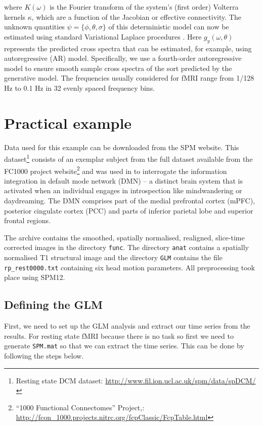 where $K(\omega)$ is the Fourier transform of the system's (first order) Volterra kernels  $\kappa$, which are a function of the Jacobian or effective connectivity. The unknown quantities $\psi=\{\phi,\theta,\sigma\}$ of this deterministic model can now be estimated using standard Variational Laplace procedures \cite{karl_vb_laplace}. Here $g_{y} (\omega,\theta)$ represents the predicted cross spectra that can be estimated, for example, using autoregressive (AR) model. Specifically, we use a fourth-order autoregressive model to ensure smooth sample cross spectra of the sort predicted by the generative model. The frequencies usually considered for fMRI range from 1/128 Hz to 0.1 Hz in 32 evenly spaced frequency bins.

\section{Practical example}

Data used for this example can be downloaded from the SPM website. This dataset\footnote{Resting state DCM dataset: \url{http://www.fil.ion.ucl.ac.uk/spm/data/spDCM/}} consists of an exemplar subject from the full dataset available from the FC1000 project website\footnote{``1000 Functional Connectomes'' Project,: \url{http://fcon_1000.projects.nitrc.org/fcpClassic/FcpTable.html}} and was used in \cite{rsDCM2015} to interrogate the information integration in default mode network (DMN) -- a distinct brain system that is activated when an individual engages in introspection like mindwandering or daydreaming. The DMN comprises part of the medial prefrontal cortex (mPFC), posterior cingulate cortex (PCC) and parts of inferior parietal lobe and superior frontal regions.

The archive contains the smoothed, spatially normalised, realigned, slice-time corrected images in the directory \texttt{func}. The directory \texttt{anat} contains a spatially normalised T1 structural image and the directory \texttt{GLM} contains the file \texttt{rp\_rest0000.txt} containing six head motion parameters. All preprocessing took place using SPM12.

\subsection{Defining the GLM}
First, we need to set up the GLM analysis and extract our time series from the results. For resting state fMRI because there is no task so first we need to generate \texttt{SPM.mat} so that we can extract the time series. This can be done by following the steps below.

